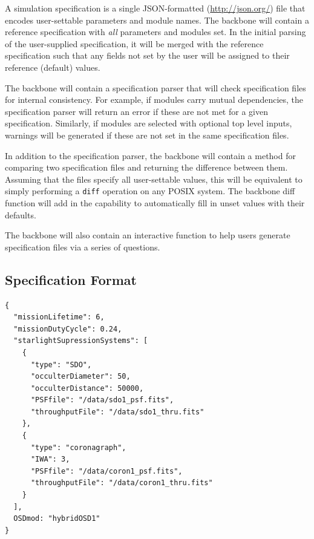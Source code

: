 \documentclass[cleanfoot]{asme2ej}
\begin{document}
A simulation specification is a single JSON-formatted (\url{http://json.org/}) file that encodes user-settable parameters and module names.  The backbone will contain a reference specification with \emph{all} parameters and modules set.  In the initial parsing of the user-supplied specification, it will be merged with the reference specification such that any fields not set by the user will be assigned to their reference (default) values.   

The backbone will contain a specification parser that will check specification files for internal consistency.  For example, if modules carry mutual dependencies, the specification parser will return an error if these are not met for a given specification.  Similarly, if modules are selected with optional top level inputs, warnings will be generated if these are not set in the same specification files.

In addition to the specification parser, the backbone will contain a method for comparing two specification files and returning the difference between them.  Assuming that the files specify all user-settable values, this will be equivalent to simply performing a \verb+diff+ operation on any POSIX system.  The backbone diff function will add in the capability to automatically fill in unset values with their defaults.

The backbone will also contain an interactive function to help users generate specification files via a series of questions.

\subsection{Specification Format}
\begin{verbatim}
{
  "missionLifetime": 6,
  "missionDutyCycle": 0.24,
  "starlightSupressionSystems": [
    {
      "type": "SDO",
      "occulterDiameter": 50,
      "occulterDistance": 50000,
      "PSFfile": "/data/sdo1_psf.fits",
      "throughputFile": "/data/sdo1_thru.fits"
    },
    {
      "type": "coronagraph",
      "IWA": 3,
      "PSFfile": "/data/coron1_psf.fits",
      "throughputFile": "/data/coron1_thru.fits"
    }
  ],
  OSDmod: "hybridOSD1"
}
\end{verbatim}

\end{document}
